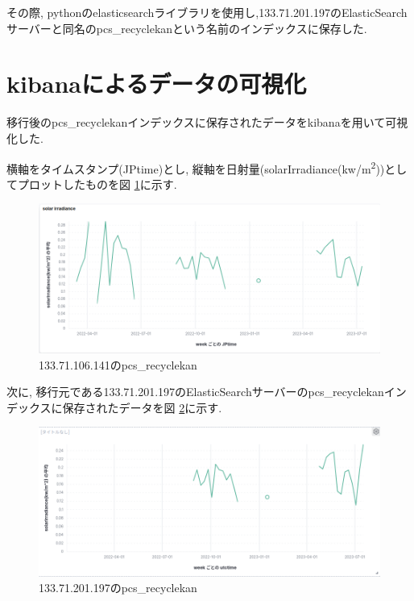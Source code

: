 \documentclass[a4j,12pt,]{jarticle}
\begin{document}
その際, pythonのelasticsearchライブラリを使用し,133.71.201.197のElasticSearchサーバーと同名のpcs\_recyclekanという名前のインデックスに保存した.

\section{kibanaによるデータの可視化}

移行後のpcs\_recyclekanインデックスに保存されたデータをkibanaを用いて可視化した.

横軸をタイムスタンプ(JPtime)とし, 縦軸を日射量(solarIrradiance(\si{kw/m^2}))としてプロットしたものを図 \ref{p1}に示す.

\begin{figure}[H]
  \begin{center}
    \includegraphics[width=160mm]{1.png}
    \caption{133.71.106.141のpcs\_recyclekan}
    \label{p1}
  \end{center}
\end{figure}

次に, 移行元である133.71.201.197のElasticSearchサーバーのpcs\_recyclekanインデックスに保存されたデータを図 \ref{p2}に示す.

\begin{figure}[H]
  \begin{center}
    \includegraphics[width=160mm]{2.png}
    \caption{133.71.201.197のpcs\_recyclekan}
    \label{p2}
  \end{center}
\end{figure}
\end{document}
